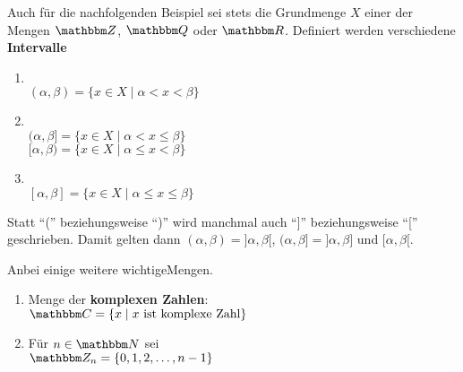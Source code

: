 \begin{Unit}
Auch für die nachfolgenden Beispiel sei stets die Grundmenge $X$ einer der 
Mengen $\ZZ$, $\QQ$ oder $\RR$. Definiert werden verschiedene 
\textbf{Intervalle}
\begin{enumerate}
  \item {} \\
    $ (\alpha, \beta) = \{x \in X \mid \alpha < x < \beta \} $
  \item {} \\
    $ (\alpha, \beta] = \{x \in X \mid \alpha < x \leq \beta\} $ \\ 
    $ [\alpha, \beta) = \{x \in X \mid \alpha \leq x < \beta\} $ 
  \item {} 
    \\
    $ [\alpha, \beta] = \{x \in X \mid \alpha \leq x \leq \beta\} $
\end{enumerate}
  
Statt \enquote{(} beziehungsweise \enquote{)} wird manchmal auch
\enquote{]} beziehungsweise \enquote{[} geschrieben. Damit gelten dann
$(\alpha, \beta) = ]\alpha, \beta[$, $(\alpha, \beta] = ]\alpha, \beta]$ und
$[\alpha, \beta[$.
\end{Unit}

\begin{Unit}[Beispiel] Anbei einige weitere wichtigeMengen.
\begin{enumerate}
\item Menge der \textbf{komplexen Zahlen}: \\
  $\CC = \{x \mid x\text{ ist komplexe Zahl}\} $
\item Für $n \in \NN$ sei \\
  $ \ZZ_n =  \{0, 1, 2, \ldots, n-1\} $
\end{enumerate}
\end{Unit}


